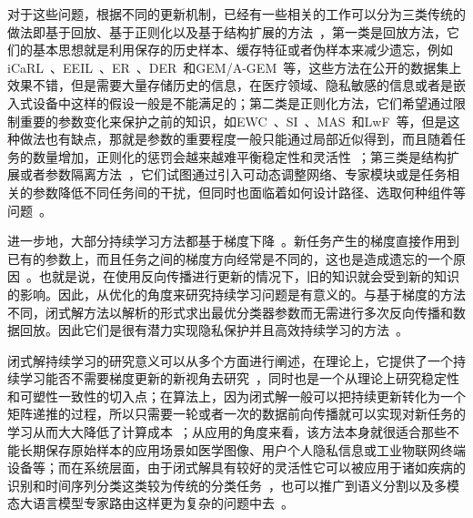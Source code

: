 对于这些问题，根据不同的更新机制，已经有一些相关的工作可以分为三类传统的做法即基于回放、基于正则化以及基于结构扩展的方法~\citep{wang2024survey,zhou2024class,zhou2023cil_survey_zh,wang2025llm_cl_zh}，第一类是回放方法，它们的基本思想就是利用保存的历史样本、缓存特征或者伪样本来减少遗忘，例如iCaRL~\citep{rebuffi2017icarl}、EEIL~\citep{castro2018end}、ER~\citep{rolnick2019experience}、DER~\citep{buzzega2020dark}和GEM/A-GEM~\citep{lopez2017gradient,chaudhry2019continual}等，这些方法在公开的数据集上效果不错，但是需要大量存储历史的信息，在医疗领域、隐私敏感的信息或者是嵌入式设备中这样的假设一般是不能满足的；第二类是正则化方法，它们希望通过限制重要的参数变化来保护之前的知识，如EWC~\citep{kirkpatrick2017ewc}、SI~\citep{zenke2017continual}、MAS~\citep{aljundi2018memory}和LwF~\citep{li2017learning}等，但是这种做法也有缺点，那就是参数的重要程度一般只能通过局部近似得到，而且随着任务的数量增加，正则化的惩罚会越来越难平衡稳定性和灵活性~\citep{zhou2023cil_survey_zh}；第三类是结构扩展或者参数隔离方法~\citep{rusu2016progressive,aljundi2017expert,wang2022dualprompt}，它们试图通过引入可动态调整网络、专家模块或是任务相关的参数降低不同任务间的干扰，但同时也面临着如何设计路径、选取何种组件等问题~\citep{hu2021lora,wang2023orthogonal,chen2024coin}。

进一步地，大部分持续学习方法都基于梯度下降~\citep{wang2024survey,zhou2024class}。新任务产生的梯度直接作用到已有的参数上，而且任务之间的梯度方向经常是不同的，这也是造成遗忘的一个原因~\citep{goodfellow2013catastrophic,lopez2017gradient,zhai2023investigating}。也就是说，在使用反向传播进行更新的情况下，旧的知识就会受到新的知识的影响。因此，从优化的角度来研究持续学习问题是有意义的。与基于梯度的方法不同，闭式解方法以解析的形式求出最优分类器参数而无需进行多次反向传播和数据回放\citep{zhuang2022acil,zhuang2024dsal,fang2024air,GKEAL_Zhuang_CVPR2023,GACL_Zhuang_NeurIPS2024}。因此它们是很有潜力实现隐私保护并且高效持续学习的方法~\citep{zhuang2022acil,zhuang2024dsal,ZHUANG2024107285,he2024realrepresentationenhancedanalytic}。

闭式解持续学习的研究意义可以从多个方面进行阐述，在理论上，它提供了一个持续学习能否不需要梯度更新的新视角去研究~\citep{zhuang2022acil,zhuang2024dsal,fang2024air}，同时也是一个从理论上研究稳定性和可塑性一致性的切入点；在算法上，因为闭式解一般可以把持续更新转化为一个矩阵递推的过程，所以只需要一轮或者一次的数据前向传播就可以实现对新任务的学习从而大大降低了计算成本~\citep{GKEAL_Zhuang_CVPR2023,GACL_Zhuang_NeurIPS2024,AEF-OCL_Zhuang_TVT2024}；从应用的角度来看，该方法本身就很适合那些不能长期保存原始样本的应用场景如医学图像、用户个人隐私信息或工业物联网终端设备等；而在系统层面，由于闭式解具有较好的灵活性它可以被应用于诸如疾病的识别和时间序列分类这类较为传统的分类任务~\citep{rebuffi2017icarl, qiao2024tscil}，也可以推广到语义分割以及多模态大语言模型专家路由这样更为复杂的问题中去~\citep{cermelli2020mib, douillard2021plop, zhao2025mllm, chen2024coin}。

